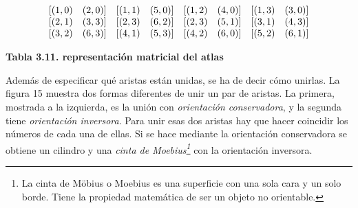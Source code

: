 $$
\begin{array}{c@{}c@{}c@{}c}
 \begin{array}{cc}
         [(1,0) & (2,0)]
  \end{array} & \begin{array}{cc}
         [(1,1) & (5,0)]
  \end{array} & \begin{array}{cc}
         [(1,2) & (4,0)]
  \end{array} &
  \begin{array}{cc}
         [(1,3) & (3,0)] 
  \end{array}
  \\
  \begin{array}{cc}
         [(2,1) & (3,3)]
  \end{array} & \begin{array}{cc}
         [(2,3) & (6,2)]
  \end{array} & \begin{array}{cc}
         [(2,3) & (5,1)] 
  \end{array} &
  \begin{array}{cc}
         [(3,1) & (4,3)]
  \end{array}
  \\
  \begin{array}{cc}
         [(3,2) & (6,3)]
  \end{array} & \begin{array}{cc}
         [(4,1) & (5,3)]
  \end{array} & \begin{array}{cc}
         [(4,2) & (6,0)] 
  \end{array} &
  \begin{array}{cc}
         [(5,2) & (6,1)] 
  \end{array}
\end{array}
$$   

\begin{center}
\textbf{Tabla 3.11. \footnotesize{representación matricial del atlas}}
\end{center}

Además de especificar qué aristas están unidas, se ha de decir cómo unirlas. La figura 15 muestra dos formas diferentes de unir un par de aristas. La primera, mostrada a la izquierda, es la unión con \textit{orientación conservadora}, y la segunda tiene \textit{orientación inversora}. Para unir esas dos aristas hay que hacer coincidir los números de cada una de ellas. Si se hace mediante la orientación conservadora se obtiene un cilindro y una \textit{cinta de Moebius\footnote{La cinta de Möbius o Moebius es una superficie con una sola cara y un solo borde. Tiene la propiedad matemática de ser un objeto no orientable.}} con la orientación inversora.

